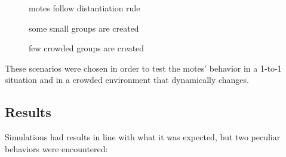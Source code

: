 \documentclass[11pt]{article}
\begin{document}
\begin{figure}[H]
  \centering
  \begin{minipage}{0.32\textwidth}
    \centering
    \caption*{motes follow distantiation rule}
    \label{distantiation}
    
  \end{minipage}
  \begin{minipage}{0.32\textwidth}
    \centering
    \caption*{some small groups are created}
    \label{small-groups}
    
  \end{minipage}
  \begin{minipage}{0.32\textwidth}
    \centering
    \caption*{few crowded groups are created}
    \label{crowded-groups}
    
  \end{minipage}
\end{figure}

These scenarios were chosen in order to test the motes' behavior in a 1-to-1 situation and in a crowded environment that dynamically changes.

\subsection{Results}
Simulations had results in line with what it was expected, but two peculiar behaviors were encountered:
\end{document}
